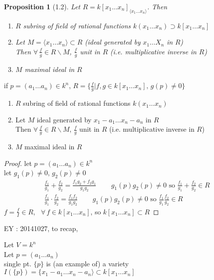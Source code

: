 \documentclass[10pt]{amsart}
\newtheorem{proposition}{Proposition}
\newcommand{\exercisehead}[1]
  { \smallskip
   \noindent{\small\bf Exercise #1.}
  }
\begin{document}
\begin{multicols*}{2}
\begin{proposition}[1.2]
  Let $R= k[x_1 \dots x_n]_{\langle x_1 \dots x_n \rangle }$.  Then
\begin{enumerate}
\item[(a)] $R$ subring of field of rational functions $k(x_1 \dots x_n) \supset k[x_1 \dots x_n]$
\item[(b)] Let $M=\langle x_1 \dots x_n \rangle \subset R$ (ideal generated by $x_1 \dots X_n$ in $R$) \\
Then $\forall \, \frac{f}{g} \in R \backslash M$, $\frac{f}{g}$ unit in $R$ (i.e. multiplicative inverse in $R$)
\item[(c)] $M$ maximal ideal in $R$
\end{enumerate}
\end{proposition}


\exercisehead{1} if $p=(a_1 \dots a_n) \in k^n$, $R = \lbrace \frac{f}{g} | f,g\in k[x_1 \dots x_n] , \, g(p) \neq 0 \rbrace$ 
\begin{enumerate}
\item[(a)] $R$ subring of field of rational functions $k(x_1 \dots x_n)$ 
\item[(b)] Let $M$ ideal generated by $x_1 - a_1 \dots x_n -a_n$ in $R$  \\
Then $\forall \, \frac{f}{g} \in R\backslash M$, $\frac{f}{g}$ unit in $R$ (i.e. multiplicative inverse in $R$)
\item[(c)]  $M$ maximal ideal in $R$
\end{enumerate}


\begin{proof}
let $p = (a_1 \dots a_n) \in k^n$ \\
let $g_1(p) \neq 0$, $g_2(p) \neq 0$ 
\[
\begin{gathered}
  \frac{f_1}{g_1 } + \frac{f_2}{g_2} = \frac{f_1 g_2 + f_2 g_1}{ g_1 g_2 } \quad \quad \,  g_1(p)g_2(p) \neq 0 \text{ so } \frac{f_1}{g_1} + \frac{f_2}{g_2} \in R \\
 \frac{f_1}{g_1} \cdot \frac{f_2}{g_2} = \frac{f_1 f_2}{g_1 g_2} \quad \quad \, g_1(p) g_2(p) \neq 0 \text{ so } \frac{f_1}{g_1}\frac{f_2}{g_2} \in R
\end{gathered}
\]
$f= \frac{f}{I} \in R$, \quad \, $\forall \, f\in k[x_1 \dots x_n]$, so $k[x_1 \dots x_n]\subset R$

\end{proof}

EY : 20141027, to recap, 

Let $V = k^n$ \\
Let $p = (a_1 \dots a_n)$ \\
single pt. $\lbrace p \rbrace$ is (an example of) a variety \\
$I(\lbrace p \rbrace) = \lbrace x_1 -a_1 \dots x_n -a_n \rangle \subset k[x_1 \dots x_n]$ \\


\end{multicols*}
\end{document}
